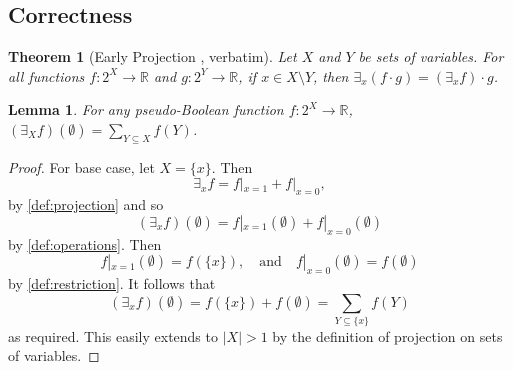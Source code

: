 \documentclass{article}
\newtheorem{theorem}{Theorem}
\newtheorem{lemma}{Lemma}
\theoremstyle{definition}
\theoremstyle{remark}
\begin{document}
\subsection{Correctness}

\begin{theorem}[Early Projection
  \cite{DBLP:conf/aaai/DudekPV20,DBLP:conf/cp/DudekPV20}, verbatim]
  Let $X$ and $Y$ be sets of variables. For all functions $f\colon 2^X \to
  \mathbb{R}$ and $g\colon 2^Y \to \mathbb{R}$, if $x \in X \setminus Y$, then
  $\exists_x (f \cdot g) = (\exists_x f) \cdot g$.
\end{theorem}

\begin{lemma} \label{lemma:sum}
  For any pseudo-Boolean function $f\colon 2^X \to \mathbb{R}$, $(\exists_X
  f)(\emptyset) = \sum_{Y \subseteq X} f(Y)$.
\end{lemma}
\begin{proof}
  For base case, let $X = \{x\}$. Then
  \[
    \exists_xf = f|_{x=1} + f|_{x=0},
  \]
  by \cref{def:projection} and so
  \[
    (\exists_xf)(\emptyset) = f|_{x=1}(\emptyset) + f|_{x=0}(\emptyset)
  \]
  by \cref{def:operations}. Then
  \[
    f|_{x=1}(\emptyset) = f(\{x\}), \quad \text{and} \quad f|_{x=0}(\emptyset) =
    f(\emptyset)
  \]
  by \cref{def:restriction}. It follows that
  \[
    (\exists_xf)(\emptyset) = f(\{x\}) + f(\emptyset) = \sum_{Y \subseteq \{x\}}
    f(Y)
  \]
  as required. This easily extends to $|X| > 1$ by the definition of projection
  on sets of variables. %
\end{proof}
\end{document}
